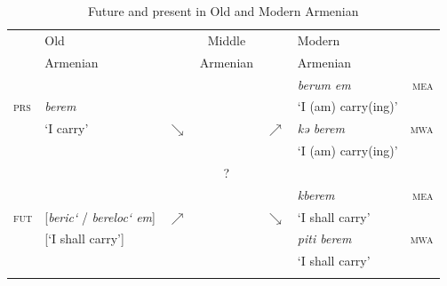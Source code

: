 \documentclass[output=paper,colorlinks,citecolor=brown]{langscibook}
\begin{document}
	\begin{table}
		\caption{Future and present in Old and Modern Armenian}
		\label{tab:meyer:prsfut1}
		\begin{tabularx}{1\textwidth}{l llcll r}
			\lsptoprule    & Old                                       &            &  Middle  &            & Modern              &     \\
			               & Armenian                                  &            & Armenian &            & Armenian            &     \\ \midrule
			               &                                           &            &          &            & \textit{berum em}   & \textsc{mea} \\
			\textsc{prs}   & \textit{berem}                            &            &          &            & ‘I (am) carry(ing)’ &     \\
			               & ‘I carry’                                 & $\searrow$ &          & $\nearrow$ & \textit{kə berem}   & \textsc{mwa} \\
			               &                                           &            &          &            & ‘I (am) carry(ing)’ &     \\
			               &                                           &            &    ?     &            &                     &     \\
			               &                                           &            &          &            & \textit{kberem}     & \textsc{mea} \\
			\textsc{fut}   & {[\textit{beric‘} / \textit{bereloc‘ em}]} & $\nearrow$ &          & $\searrow$ & ‘I shall carry’     &     \\
			               & {[‘I shall carry’]}                        &            &          &            & \textit{piti berem} & \textsc{mwa} \\
			               &                                           &            &          &            & ‘I shall carry’     &     \\
			\lspbottomrule &                                           &            &          &            &                     &
		\end{tabularx}
	\end{table}
	
\end{document}
